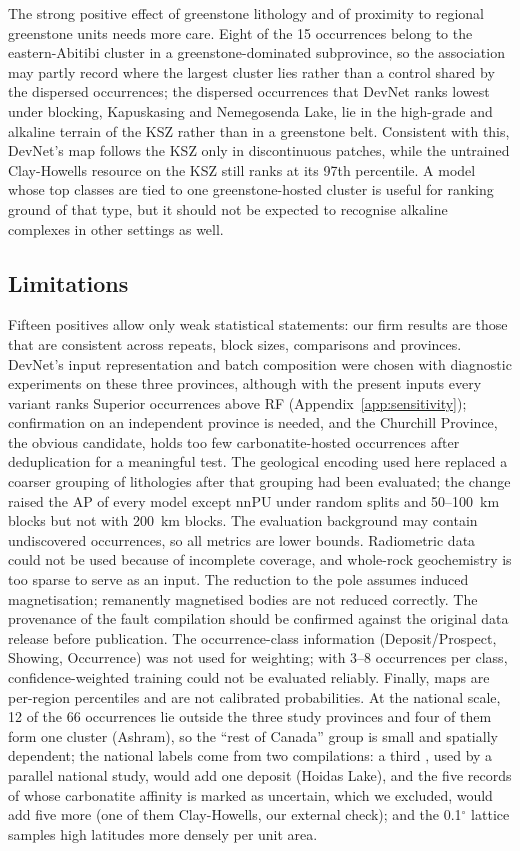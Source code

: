 \documentclass[pdflatex,sn-apa]{sn-jnl}
\begin{document}
The strong positive effect of greenstone lithology and of proximity to regional greenstone units needs more care. Eight of the 15 occurrences belong to the eastern-Abitibi cluster in a greenstone-dominated subprovince, so the association may partly record where the largest cluster lies rather than a control shared by the dispersed occurrences; the dispersed occurrences that DevNet ranks lowest under blocking, Kapuskasing and Nemegosenda Lake, lie in the high-grade and alkaline terrain of the KSZ rather than in a greenstone belt. Consistent with this, DevNet's map follows the KSZ only in discontinuous patches, while the untrained Clay-Howells resource on the KSZ still ranks at its 97th percentile. A model whose top classes are tied to one greenstone-hosted cluster is useful for ranking ground of that type, but it should not be expected to recognise alkaline complexes in other settings as well.

\subsection{Limitations}\label{sec:limitations}

Fifteen positives allow only weak statistical statements: our firm results are those that are consistent across repeats, block sizes, comparisons and provinces. DevNet's input representation and batch composition were chosen with diagnostic experiments on these three provinces, although with the present inputs every variant ranks Superior occurrences above RF (Appendix~\ref{app:sensitivity}); confirmation on an independent province is needed, and the Churchill Province, the obvious candidate, holds too few carbonatite-hosted occurrences after deduplication for a meaningful test. The geological encoding used here replaced a coarser grouping of lithologies after that grouping had been evaluated; the change raised the AP of every model except nnPU under random splits and 50--100~km blocks but not with 200~km blocks. The evaluation background may contain undiscovered occurrences, so all metrics are lower bounds. Radiometric data could not be used because of incomplete coverage, and whole-rock geochemistry is too sparse to serve as an input. The reduction to the pole assumes induced magnetisation; remanently magnetised bodies are not reduced correctly. The provenance of the fault compilation should be confirmed against the original data release before publication. The occurrence-class information (Deposit/Prospect, Showing, Occurrence) was not used for weighting; with 3--8 occurrences per class, confidence-weighted training could not be evaluated reliably. Finally, maps are per-region percentiles and are not calibrated probabilities. At the national scale, 12 of the 66 occurrences lie outside the three study provinces and four of them form one cluster (Ashram), so the ``rest of Canada'' group is small and spatially dependent; the national labels come from two compilations: a third \citep{Huston2024}, used by a parallel national study, would add one deposit (Hoidas Lake), and the five records of \citet{Orris2018} whose carbonatite affinity is marked as uncertain, which we excluded, would add five more (one of them Clay-Howells, our external check); and the 0.1$^\circ$ lattice samples high latitudes more densely per unit area.
\end{document}
